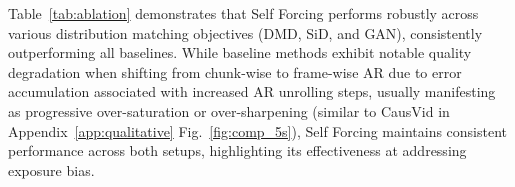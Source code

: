 \documentclass{article}
\begin{document}
Table~\ref{tab:ablation} demonstrates that Self Forcing performs robustly across various distribution matching objectives (DMD, SiD, and GAN), consistently outperforming all baselines.
While baseline methods exhibit notable quality degradation when shifting from chunk-wise to frame-wise AR due to error accumulation associated with increased AR unrolling steps, usually manifesting as progressive over-saturation or over-sharpening (similar to CausVid in Appendix~\ref{app:qualitative} Fig.~\ref{fig:comp_5s}), Self Forcing maintains consistent performance across both setups, highlighting its effectiveness at addressing exposure bias.

\end{document}

